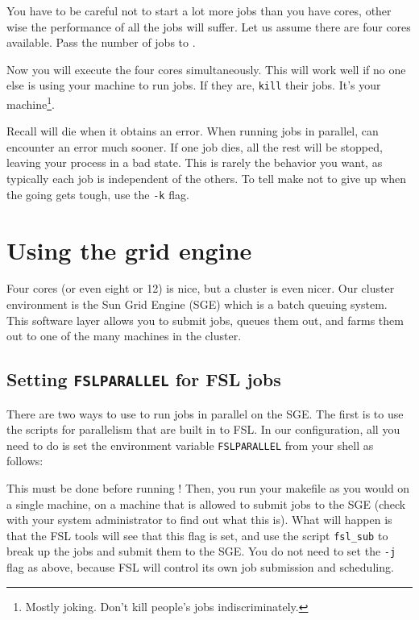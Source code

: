 You have to be careful not to start a lot more jobs than you have cores, other wise the performance of all the jobs will suffer. Let us assume there are four cores available. Pass the number of jobs to \maken. 

Now you will execute the four cores simultaneously. This will work well if no one else is using your machine to run jobs. If they are, \texttt{kill} their jobs. It's your machine\footnote{Mostly joking. Don't kill people's jobs indiscriminately.}.

Recall \maken{} will die when it obtains an error. When running jobs in parallel, \maken{} can encounter an error much sooner. If one job dies, all the rest will be stopped, leaving your process in a bad state. This is rarely the behavior you want, as typically each job is independent of the others. To tell make not to give up when the going gets tough, use the \texttt{-k} flag.

\section{Using the grid engine}

Four cores (or even eight or 12) is nice, but a cluster is even nicer. Our cluster environment is the Sun Grid Engine (SGE) which is a batch queuing system. This software layer allows you to submit jobs, queues them out, and farms them out to one of the many machines in the cluster.

\subsection{Setting \texttt{FSLPARALLEL} for FSL jobs}

There are two ways to use \maken{} to run jobs in parallel on the SGE. The first is to use the scripts for parallelism that are built in to FSL. In our configuration, all you need to do is set the environment variable \texttt{FSLPARALLEL} from your shell as follows:

This must be done before running \maken! Then, you run your makefile as you would on a single machine, on a machine that is allowed to submit jobs to the SGE (check with your system administrator to find out what this is). What will happen is that the FSL tools will see that this flag is set, and use the script \texttt{fsl_sub} to break up the jobs and submit them to the SGE. You do not need to set the \texttt{-j} flag as above, because FSL will control its own job submission and scheduling. 

